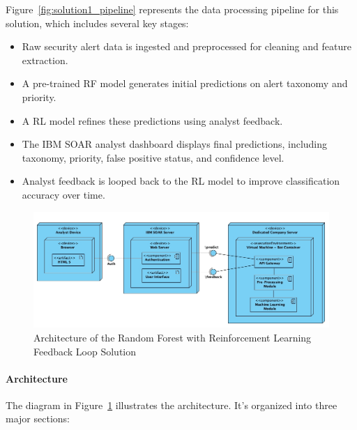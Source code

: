 Figure~\ref{fig:solution1_pipeline} represents the data processing pipeline for this solution, which includes several key stages:

\begin{itemize}
    \item Raw security alert data is ingested and preprocessed for cleaning and feature extraction.
    \item A pre-trained RF model generates initial predictions on alert taxonomy and priority.
    \item A RL model refines these predictions using analyst feedback.
    \item The IBM SOAR analyst dashboard displays final predictions, including taxonomy, priority, false positive status, and confidence level.
    \item Analyst feedback is looped back to the RL model to improve classification accuracy over time.
\end{itemize}

\begin{figure}[h!]
    \centering
    \includegraphics[width=\textwidth]{ch3/assets/Soltution1_Archquiteture.png}
    \caption{Architecture of the Random Forest with Reinforcement Learning Feedback Loop Solution}
    \label{fig:solution1_architecture}
\end{figure}

\paragraph{Architecture}

The diagram in Figure~\ref{fig:solution1_architecture} illustrates the architecture. It's organized into three major sections:

